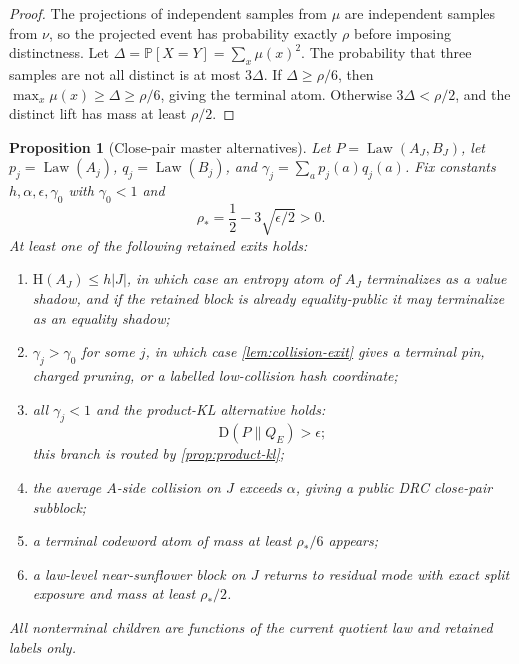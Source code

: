 \documentclass[11pt]{article}
\newcommand{\Cref}[1]{\ref{#1}}
\newtheorem{proposition}[theorem]{Proposition}
\theoremstyle{remark}
\newcommand{\Prob}{\mathbb P}
\newcommand{\HH}{\mathrm H}
\newcommand{\KL}{\mathrm D}
\newcommand{\Law}{\operatorname{Law}}
\begin{document}
\begin{proof}
The projections of independent samples from $\mu$ are independent samples from $\nu$, so the projected event has probability exactly $\rho$ before imposing distinctness.  Let $\Delta=\Prob[X=Y]=\sum_x\mu(x)^2$.  The probability that three samples are not all distinct is at most $3\Delta$.  If $\Delta\ge\rho/6$, then $\max_x\mu(x)\ge\Delta\ge\rho/6$, giving the terminal atom.  Otherwise $3\Delta<\rho/2$, and the distinct lift has mass at least $\rho/2$.
\end{proof}

\begin{proposition}[Close-pair master alternatives]\label{prop:close-pair}
Let $P=\Law(A_J,B_J)$, let $p_j=\Law(A_j)$, $q_j=\Law(B_j)$, and $\gamma_j=\sum_a p_j(a)q_j(a)$.  Fix constants $h,\alpha,\epsilon,\gamma_0$ with $\gamma_0<1$ and
\[
        \rho_*=\frac{1}{2}-3\sqrt{\epsilon/2}>0.
\]
At least one of the following retained exits holds:
\begin{enumerate}[label=\textup{(\arabic*)}]
\item $\HH(A_J)\le h|J|$, in which case an entropy atom of $A_J$ terminalizes as a value shadow, and if the retained block is already equality-public it may terminalize as an equality shadow;
\item $\gamma_j>\gamma_0$ for some $j$, in which case \Cref{lem:collision-exit} gives a terminal pin, charged pruning, or a labelled low-collision hash coordinate;
\item all $\gamma_j<1$ and the product-KL alternative holds:
\[
        \KL(P\|Q_E)>\epsilon;
\]
this branch is routed by \Cref{prop:product-kl};
\item the average $A$-side collision on $J$ exceeds $\alpha$, giving a public DRC close-pair subblock;
\item a terminal codeword atom of mass at least $\rho_*/6$ appears;
\item a law-level near-sunflower block on $J$ returns to residual mode with exact split exposure and mass at least $\rho_*/2$.
\end{enumerate}
All nonterminal children are functions of the current quotient law and retained labels only.
\end{proposition}
\end{document}
